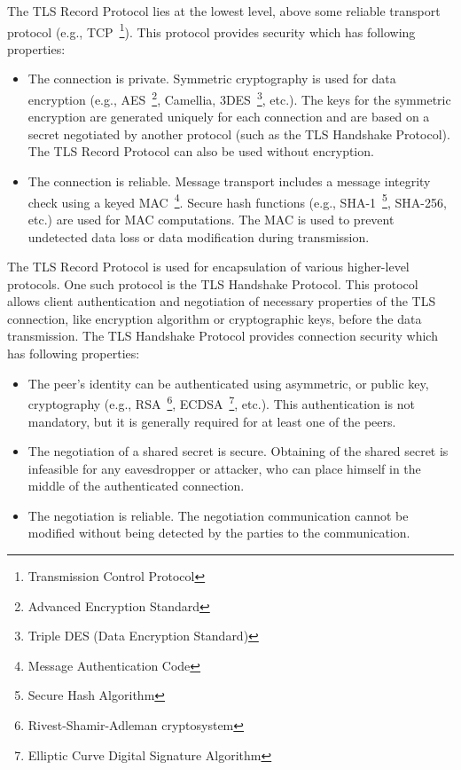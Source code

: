     The TLS Record Protocol lies at the lowest level, above some reliable
    transport protocol (e.g., TCP~\footnote{Transmission Control Protocol}).
    This protocol provides security which has following properties:
    \begin{itemize}
        \item The connection is private. Symmetric cryptography is used
        for data encryption (e.g., AES~\footnote{Advanced Encryption Standard},
        Camellia, 3DES~\footnote{Triple DES (Data Encryption Standard)}, etc.).
        The keys for the symmetric encryption are generated uniquely
        for each connection
        and are based on a secret negotiated by another protocol
        (such as the TLS Handshake Protocol). The TLS Record Protocol can also
        be used without encryption.
        \item The connection is reliable. Message transport includes
        a message integrity check using a keyed
        MAC~\footnote{Message Authentication Code}. Secure hash functions
        (e.g., SHA-1~\footnote{Secure Hash Algorithm}, SHA-256, etc.) are
        used for MAC computations. The MAC is used to prevent undetected
        data loss or data modification during transmission.
    \end{itemize}

    The TLS Record Protocol is used for encapsulation of various higher-level
    protocols. One such protocol is the TLS Handshake Protocol. This protocol
    allows client authentication and negotiation of necessary properties
    of the TLS connection, like encryption algorithm or cryptographic keys,
    before the data transmission. The TLS Handshake Protocol provides
    connection security which has following properties:
    \begin{itemize}
        \item The peer's identity can be authenticated using asymmetric, or
        public key, cryptography (e.g.,
        RSA~\footnote{Rivest-Shamir-Adleman cryptosystem},
        ECDSA~\footnote{Elliptic Curve Digital Signature Algorithm}, etc.).
        This authentication is not mandatory, but it is generally required
        for at least one of the peers.
        \item The negotiation of a shared secret is secure. Obtaining of
        the shared secret is infeasible for any eavesdropper or attacker,
        who can place himself in the middle of the authenticated connection.
        \item The negotiation is reliable. The negotiation communication
        cannot be modified without being detected by the parties to the
        communication.~\cite{rfc5246}
    \end{itemize}

